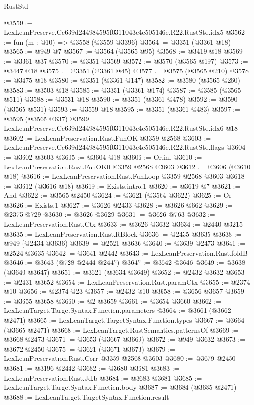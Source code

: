 \begin{lexlean}{RustStd}
\begin{coremodule}
@3559 := LexLeanPreserve.Cc639d244984595f0311043c4c505146e.R22.RustStd.idx5
@3562 := fun (m : @10) => @3558 (@3559 @3396)
@3564 := @3351 (@3361 @18)
@3565 := @949 @7
@3567 := @3564 (@3565 @95)
@3568 := @3419 @18
@3569 := @3361 @37
@3570 := @3351 @3569
@3572 := @3570 (@3565 @197)
@3573 := @3447 @18
@3575 := @3351 (@3361 @45)
@3577 := @3575 (@3565 @210)
@3578 := @3475 @18
@3580 := @3351 (@3361 @147)
@3582 := @3580 (@3565 @260)
@3583 := @3503 @18
@3585 := @3351 (@3361 @174)
@3587 := @3585 (@3565 @511)
@3588 := @3531 @18
@3590 := @3351 (@3361 @478)
@3592 := @3590 (@3565 @531)
@3593 := @3559 @18
@3595 := @3351 (@3361 @483)
@3597 := @3595 (@3565 @637)
@3599 := LexLeanPreserve.Cc639d244984595f0311043c4c505146e.R22.RustStd.idx6 @18
@3602 := LexLeanPreservation.Rust.FunOK @3359 @2568
@3603 := LexLeanPreserve.Cc639d244984595f0311043c4c505146e.R22.RustStd.flags
@3604 := @3602 @3603
@3605 := @3604 @18
@3606 := Or.inl
@3610 := LexLeanPreservation.Rust.FunOK0 @3359 @2568 @3603
@3612 := @3606 (@3610 @18)
@3616 := LexLeanPreservation.Rust.FunLoop @3359 @2568 @3603
@3618 := @3612 (@3616 @18)
@3619 := Exists.intro.{1}
@3620 := @3619 @7
@3621 := And
@3622 := @3565 @2450
@3624 := @3621 (@3564 @3622)
@3625 := Or
@3626 := Exists.{1}
@3627 := @3626 @2433
@3628 := @3626 @662
@3629 := @2375 @729
@3630 := @3626 @3629
@3631 := @3626 @763
@3632 := LexLeanPreservation.Rust.Ctx
@3633 := @3626 @3632
@3634 := @2440 @3215
@3635 := LexLeanPreservation.Rust.RBlock
@3636 := @2435 @3635
@3638 := @949 (@2434 @3636)
@3639 := @2521 @3636
@3640 := @3639 @2473
@3641 := @2524 @3635
@3642 := @3641 @2442
@3643 := LexLeanPreservation.Rust.foldB
@3646 := @3643 (@728 @2444 @2447)
@3647 := @3642 @3646
@3649 := @3638 (@3640 @3647)
@3651 := @3621 (@3634 @3649)
@3652 := @2432 @3632
@3653 := @2431 @3652
@3654 := LexLeanPreservation.Rust.paramCtx
@3655 := @2374 @10
@3656 := @2374 @23
@3657 := @2432 @10
@3658 := @3656 @3657
@3659 := @3655 @3658
@3660 := @2 @3659
@3661 := @3654 @3660
@3662 := LexLeanTarget.TargetSyntax.Function.parameters
@3664 := @3661 (@3662 @2471)
@3665 := LexLeanTarget.TargetSyntax.Function.types
@3667 := @3664 (@3665 @2471)
@3668 := LexLeanTarget.RustSemantics.patternsOf
@3669 := @3668 @2473
@3671 := @3653 (@3667 @3669)
@3672 := @949 @3632
@3673 := @3672 @2450
@3675 := @3621 (@3671 @3673)
@3679 := LexLeanPreservation.Rust.Corr @3359 @2568 @3603
@3680 := @3679 @2450
@3681 := @3196 @2442
@3682 := @3680 @3681
@3683 := LexLeanPreservation.Rust.Jd.b
@3684 := @3683 @3681
@3685 := LexLeanTarget.TargetSyntax.Function.body
@3687 := @3684 (@3685 @2471)
@3688 := LexLeanTarget.TargetSyntax.Function.result

\end{coremodule}
\end{lexlean}

